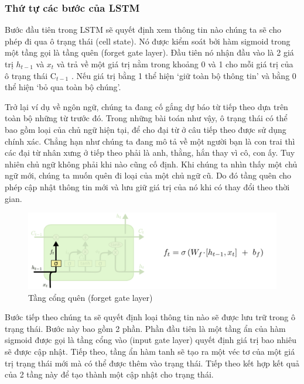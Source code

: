 \subsubsection{Thứ tự các bước của LSTM}

\indent Bước đầu tiên trong LSTM sẽ quyết định xem thông tin nào chúng ta sẽ cho phép đi qua ô trạng thái (cell state). Nó được kiểm soát bởi hàm sigmoid trong một tầng gọi là tầng quên (forget gate layer). Đầu tiên nó nhận đầu vào là 2 giá trị \( h_{t-1} \)
 và \( x_{t} \)
 và trả về một giá trị nằm trong khoảng 0 và 1 cho mỗi giá trị của ô trạng thái \( \text{C}_{t-1} \)
. Nếu giá trị bằng 1 thể hiện ‘giữ toàn bộ thông tin’ và bằng 0 thể hiện ‘bỏ qua toàn bộ chúng’.

\indent Trở lại ví dụ về ngôn ngữ, chúng ta đang cố gắng dự báo từ tiếp theo dựa trên toàn bộ những từ trước đó. Trong những bài toán như vậy, ô trạng thái có thể bao gồm loại của chủ ngữ hiện tại, để cho đại từ ở câu tiếp theo được sử dụng chính xác. Chẳng hạn như chúng ta đang mô tả về một người bạn là con trai thì các đại từ nhân xưng ở tiếp theo phải là anh, thằng, hắn thay vì cô, con ấy. Tuy nhiên chủ ngữ không phải khi nào cũng cố định. Khi chúng ta nhìn thấy một chủ ngữ mới, chúng ta muốn quên đi loại của một chủ ngữ cũ. Do đó tầng quên cho phép cập nhật thông tin mới và lưu giữ giá trị của nó khi có thay đổi theo thời gian.

\begin{figure}[H]
    \centering
    \includegraphics[width=14cm]{Images/Architecture/LSTM3-focus-f.png}
\caption{Tầng cổng quên (forget gate layer)}
\end{figure}

\indent Bước tiếp theo chúng ta sẽ quyết định loại thông tin nào sẽ được lưu trữ trong ô trạng thái. Bước này bao gồm 2 phần. Phần đầu tiên là một tầng ẩn của hàm sigmoid được gọi là tầng cổng vào (input gate layer) quyết định giá trị bao nhiêu sẽ được cập nhật. Tiếp theo, tầng ẩn hàm tanh sẽ tạo ra một véc tơ của một giá trị trạng thái mới 
 mà có thể được thêm vào trạng thái. Tiếp theo kết hợp kết quả của 2 tầng này để tạo thành một cập nhật cho trạng thái.

